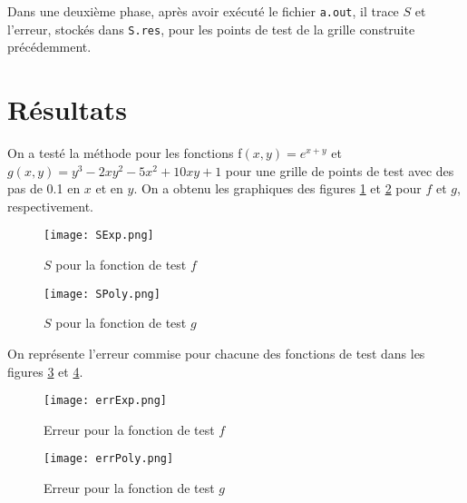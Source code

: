 \documentclass[12 pt]{article}
\begin{document}
Dans une deuxième phase, après avoir exécuté le fichier \texttt{a.out}, il trace $S$ et l'erreur, stockés dans \texttt{S.res}, pour les points de test de la grille construite précédemment.
\section{Résultats}
On a testé la méthode pour les fonctions
f$\left(x, y\right) = e^{x + y}$ et $g\left(x, y\right) = y^3 - 2xy^2 - 5x^2 + 10xy + 1$ pour une grille de points de test avec des pas de 0.1 en $x$ et en $y$. On a obtenu les graphiques des figures \ref{fig:Sexp} et \ref{fig:Spoly} pour $f$ et $g$, respectivement. 
\begin{figure}[H]
	\texttt{[image: SExp.png]}
	\caption{$S$ pour la fonction de test $f$}
	\label{fig:Sexp}
\end{figure}
\begin{figure}[H]
	\texttt{[image: SPoly.png]}
	\caption{$S$ pour la fonction de test $g$}
	\label{fig:Spoly}
\end{figure}
On représente l'erreur commise pour chacune des fonctions de test dans les figures \ref{fig:errExp} et \ref{fig:errPoly}.
\begin{figure}[H]
	\texttt{[image: errExp.png]}
	\caption{Erreur pour la fonction de test $f$}
	\label{fig:errExp}
\end{figure}
\begin{figure}[H]
	\texttt{[image: errPoly.png]}
	\caption{Erreur pour la fonction de test $g$}
	\label{fig:errPoly}
\end{figure}
\end{document}
